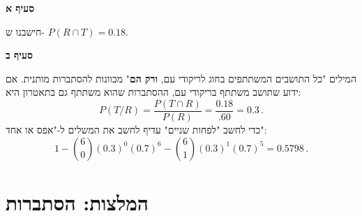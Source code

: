\textbf{סעיף א}

חישבנו ש-%
$P(R\cap T)=0.18$.

\medskip

\textbf{סעיף ב}

המילים "כל התושבים המשתתפים בחוג לריקודי עם,
\textbf{ורק הם}"
מכוונות להסתברות מותנית. אם ידוע שתושב משתתף בריקודי עם, ההסתברות שהוא משתתף גם בתאטרון היא:
\[
P(T/R) = \frac{P(T\cap R)}{P(R)}= \frac{0.18}{.60} = 0.3\,.
\]
כדי לחשב "לפחות שניים" עדיף לחשב את המשלים ל-"אפס או אחד":
\[
1-{6\choose 0}(0.3)^0(0.7)^6 -{6\choose 1}(0.3)^1(0.7)^5=0.5798\,.
\]


\np
\section*{המלצות: הסתברות}


